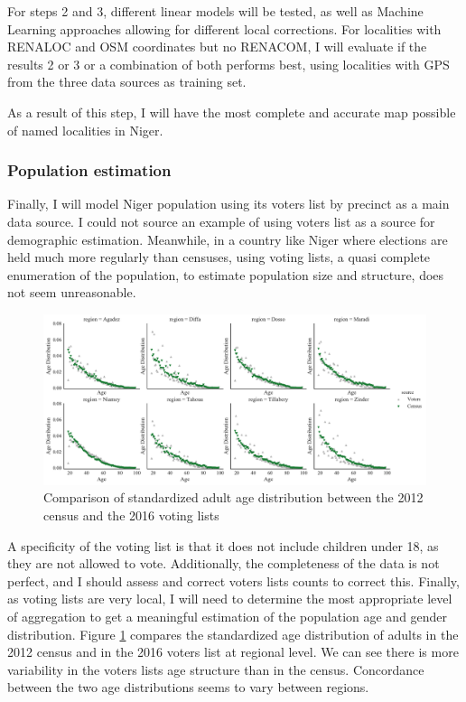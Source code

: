 For steps 2 and 3, different linear models will be tested, as well as Machine Learning approaches allowing for different local corrections. For localities with RENALOC and OSM coordinates but no RENACOM, I will evaluate if the results 2 or 3 or a combination of both performs best, using localities with GPS from the three data sources as training set.

As a result of this step, I will have the most complete and accurate map possible of named localities in Niger.

\subsubsection{Population estimation}

Finally, I will model Niger population using its voters list by precinct as a main data source. I could not source an example of using voters list as a source for demographic estimation. Meanwhile, in a country like Niger where elections are held much more regularly than censuses, using voting lists, a quasi complete enumeration of the population, to estimate population size and structure, does not seem unreasonable.

\begin{figure}[ht]
	\begin{center}
		\includegraphics[width=\textwidth]{figure/age_structure_comparison.pdf}
		\caption{Comparison of standardized adult age distribution between the 2012 census and the 2016 voting lists}
		\label{fig:age_comparison}
	\end{center}
\end{figure}

A specificity of the voting list is that it does not include children under 18, as they are not allowed to vote. Additionally, the completeness of the data is not perfect, and I should assess and correct voters lists counts to correct this. Finally, as voting lists are very local, I will need to determine the most appropriate level of aggregation to get a meaningful estimation of the population age and gender distribution. Figure \ref{fig:age_comparison} compares the standardized age distribution of adults in the 2012 census and in the 2016 voters list at regional level. We can see there is more variability in the voters lists age structure than in the census. Concordance between the two age distributions seems to vary between regions.

